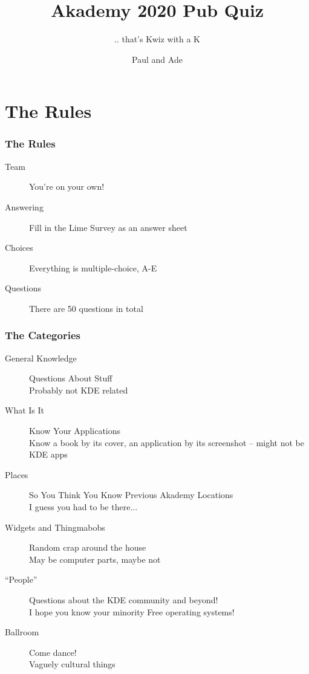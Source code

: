 \documentclass[t,compress,aspectratio=169]{beamer}
\title{Akademy 2020 Pub Quiz}
\subtitle{.. that's Kwiz with a K}
\author{Paul and Ade}
\begin{document}
\begin{withoutheadline}
\begin{frame}
\titlepage
\end{frame}
\end{withoutheadline}

\section*{The Rules}

\begin{frame}
    \frametitle{The Rules}
    \begin{description}
        \item[Team] You're on your own!
        \item[Answering] Fill in the Lime Survey as an answer sheet
        \item[Choices] Everything is multiple-choice, A-E
        \item[Questions] There are 50 questions in total
    \end{description}
\end{frame}

\begin{frame}
    \frametitle{The Categories}
    \begin{description}
        \item[General Knowledge] Questions About Stuff\\{\tiny{Probably not KDE related}}
        \item[What Is It] Know Your Applications\\{\tiny{Know a book by its cover, an application by its screenshot -- might not be KDE apps}}
        \item[Places] So You Think You Know Previous Akademy Locations\\{\tiny{I guess you had to be there...}}
        \item[Widgets and Thingmabobs] Random crap around the house\\{\tiny{May be computer parts, maybe not}}
        \item[``People''] Questions about the KDE community and beyond!\\{\tiny{I hope you know your minority Free operating systems!}}
        \item[Ballroom] Come dance!\\{\tiny{Vaguely cultural things}}
    \end{description}
\end{frame}
\end{document}
